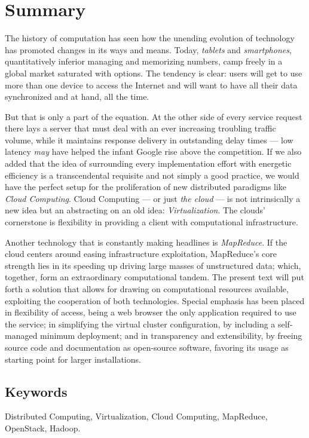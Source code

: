 \chapter*{Summary}

\noindent The history of computation has seen how the unending evolution of technology has promoted changes in its ways and means. Today, \textit{tablets} and \textit{smartphones}, quantitatively inferior managing and memorizing numbers, camp freely in a global market saturated with options. The tendency is clear: users will get to use more than one device to access the Internet and will want to have all their data synchronized and at hand, all the time.

But that is only a part of the equation. At the other side of every service request there lays a server that must deal with an ever increasing troubling traffic volume, while it maintains response delivery in outstanding delay times --- low latency \emph{may} have helped the infant Google rise above the competition. If we also added that the idea of surrounding every implementation effort with energetic efficiency is a transcendental requisite and not simply a good practice, we would have the perfect setup for the proliferation of new distributed paradigms like \emph{Cloud Computing}. Cloud Computing --- or just \emph{the cloud} --- is not intrinsically a new idea but an abstracting on an old idea: \emph{Virtualization}. The clouds' cornerstone is flexibility in providing a client with computational infrastructure.

Another technology that is constantly making headlines is \emph{MapReduce}. If the cloud centers around easing infrastructure exploitation, MapReduce's core strength lies in its speeding up driving large masses of unstructured data; which, together, form an extraordinary computational tandem. The present text will put forth a solution that allows for drawing on computational resources available, exploiting the cooperation of both technologies. Special emphasis has been placed in flexibility of access, being a web browser the only application required to use the service; in simplifying the virtual cluster configuration, by including a self-managed minimum deployment; and in transparency and extensibility, by freeing source code and documentation as open-source software, favoring its usage as starting point for larger installations.


\section*{Keywords}
\noindent Distributed Computing, Virtualization, Cloud Computing, MapReduce, OpenStack, Hadoop.
